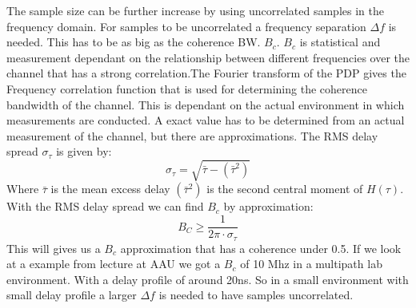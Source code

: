 The sample size can be further increase by using uncorrelated samples in the frequency domain. 
For samples to be uncorrelated a frequency separation $\Delta f$  is needed. This has to be as big as the coherence BW. $B_{c}$. $B_{c}$ is statistical and measurement dependant on the relationship between different frequencies over the channel that has a strong correlation.The Fourier transform of the PDP gives the Frequency correlation function that is used for determining the coherence bandwidth of the channel. This is dependant on the actual environment in which measurements are conducted. A exact value has to be determined from  an actual measurement of the channel, but there are approximations\citep{RayFadeHandbook}. The RMS delay spread $\sigma_{\tau}$ is given by:
\begin{equation}
\sigma_{\tau} = \sqrt{\bar{\tau} - {(\bar{\tau}^{2})}}
\end{equation}
Where $\bar{\tau}$ is the mean excess delay $(\bar{\tau}^{2})$ is 
the second central moment of $H(\tau)$. With the RMS delay spread we can find $B_c$ by approximation:
\begin{equation}
B_C \geq \frac{1}{2\pi \cdot \sigma_{\tau}}
\label{CohBW}
\end{equation}
This will gives us a $B_c$ approximation that has a coherence under 0.5. 
\citep{CohBW}
If we look at a example from lecture at AAU we got a $B_c$ of 10 Mhz in a multipath lab environment.
 With a delay profile of around 20ns. So in a small environment with small delay profile a larger $\Delta f$ is needed to have samples uncorrelated.
\citep[Chapter 18.5]{ComHandbook}

